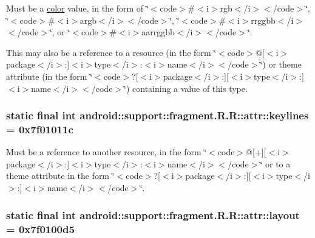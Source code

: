 Must be a \hyperlink{classandroid_1_1support_1_1fragment_1_1_r_1_1color}{color} value, in the form of \char`\"{}$<$code$>$\#$<$i$>$rgb$<$/i$>$$<$/code$>$\char`\"{}, \char`\"{}$<$code$>$\#$<$i$>$argb$<$/i$>$$<$/code$>$\char`\"{}, \char`\"{}$<$code$>$\#$<$i$>$rrggbb$<$/i$>$$<$/code$>$\char`\"{}, or \char`\"{}$<$code$>$\#$<$i$>$aarrggbb$<$/i$>$$<$/code$>$\char`\"{}. 

This may also be a reference to a resource (in the form \char`\"{}$<$code$>$@\mbox{[}$<$i$>$package$<$/i$>$:\mbox{]}$<$i$>$type$<$/i$>$:$<$i$>$name$<$/i$>$$<$/code$>$\char`\"{}) or theme attribute (in the form \char`\"{}$<$code$>$?\mbox{[}$<$i$>$package$<$/i$>$:\mbox{]}\mbox{[}$<$i$>$type$<$/i$>$:\mbox{]}$<$i$>$name$<$/i$>$$<$/code$>$\char`\"{}) containing a value of this type. \hypertarget{classandroid_1_1support_1_1fragment_1_1_r_1_1attr_fd16c0af7fc19d8c65f0167010b4eb9b}{
\subsubsection[{keylines}]{\setlength{\rightskip}{0pt plus 5cm}static final int android::support::fragment.R.R::attr::keylines = 0x7f01011c}}
\label{classandroid_1_1support_1_1fragment_1_1_r_1_1attr_fd16c0af7fc19d8c65f0167010b4eb9b}


Must be a reference to another resource, in the form \char`\"{}$<$code$>$@\mbox{[}+\mbox{]}\mbox{[}$<$i$>$package$<$/i$>$:\mbox{]}$<$i$>$type$<$/i$>$:$<$i$>$name$<$/i$>$$<$/code$>$\char`\"{} or to a theme attribute in the form \char`\"{}$<$code$>$?\mbox{[}$<$i$>$package$<$/i$>$:\mbox{]}\mbox{[}$<$i$>$type$<$/i$>$:\mbox{]}$<$i$>$name$<$/i$>$$<$/code$>$\char`\"{}. \hypertarget{classandroid_1_1support_1_1fragment_1_1_r_1_1attr_f9d09f0362f48e452bf8353a7b7bf9cc}{
\subsubsection[{layout}]{\setlength{\rightskip}{0pt plus 5cm}static final int android::support::fragment.R.R::attr::layout = 0x7f0100d5}}
\label{classandroid_1_1support_1_1fragment_1_1_r_1_1attr_f9d09f0362f48e452bf8353a7b7bf9cc}


